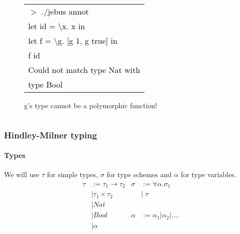\documentclass[xcolor=table]{beamer}
\newcommand{\tab}{\hspace*{1.2em}}
\begin{document}
\begin{frame}
\begin{block}
{\begin{columns}[t]
\begin{column}[T]{5cm}
\begin{figure}[h!]
				\begin{small}
			  	\begin{tabular}{l}
			      \textcolor{black}{$>$ ./jebus annot} \\
			      \textcolor{black}{let id = \textbackslash x.  x in}\\ \relax
			      \textcolor{black}{let f = \textbackslash g. [g 1, g true] in}\\
			      \textcolor{black}{\tab f id} \\
			      \textcolor{black}{Could not match type Nat with} \\
			      \textcolor{black}{type Bool}
				\end{tabular}	
			  \end{small}			  
			  \caption{g's type cannot be a polymorphic function!}
		 \end{figure}	          
     \end{column}
     \end{columns}
}

\end{block}
\end{frame}

 
\begin{frame}
\frametitle{Hindley-Milner typing}
\framesubtitle{Types}
\begin{block}{We will use $\tau$ for simple types, $\sigma$ for type schemes and $\alpha$ for type variables.}
\begin{align*}
\tau & := \tau_1\rightarrow \tau_2  &  \sigma  & := \forall  \alpha. \sigma_1\\
        & | \tau_1 \times \tau_2          &                      & | \;\tau \\
        & | Nat                                    & \\
        & | Bool                                  & \alpha & := \alpha _1 | \alpha _2| .... \\
        & | \alpha                                       & \\
\end{align*}
\end{block} 
\end{frame}  
 
\end{document}
